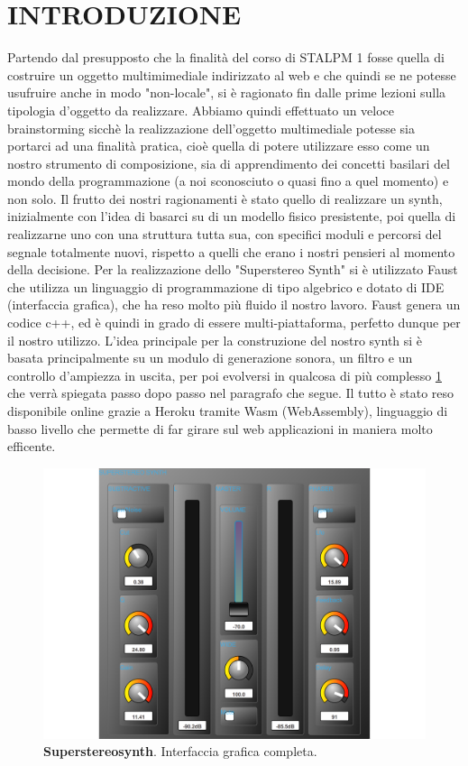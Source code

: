 \documentclass[
	a4paper,
	twocolumn
	]{article}
\begin{document}
\maketitle
\thispagestyle{empty}
\section*{INTRODUZIONE}
Partendo dal presupposto che la finalità del corso di STALPM 1 fosse quella
di costruire un oggetto multimimediale indirizzato al web e che quindi se ne
potesse usufruire anche in modo "non-locale", si è ragionato fin dalle prime
lezioni sulla tipologia d'oggetto da realizzare. Abbiamo quindi effettuato
un veloce brainstorming sicchè la realizzazione dell'oggetto multimediale
potesse sia portarci ad una finalità pratica, cioè quella di potere utilizzare
esso come un nostro strumento di composizione, sia di apprendimento dei concetti
basilari del mondo della programmazione (a noi sconosciuto o quasi fino a quel
momento) e non solo. Il frutto dei nostri ragionamenti è stato quello di realizzare un synth,
inizialmente con l'idea di basarci su di un modello fisico presistente, poi quella di
realizzarne uno con una struttura tutta sua, con specifici moduli e percorsi del segnale
totalmente nuovi, rispetto a quelli che erano i nostri pensieri al momento della decisione.
Per la realizzazione dello "Superstereo Synth" si è utilizzato Faust \cite{faust}
che utilizza un linguaggio di programmazione di tipo algebrico e dotato di IDE (interfaccia grafica), che
ha reso molto più fluido il nostro lavoro. Faust genera un codice c++, ed è quindi in grado
di essere multi-piattaforma, perfetto dunque per il nostro utilizzo. L'idea principale per
la construzione del nostro synth si è basata principalmente su un modulo di generazione sonora, un filtro e
un controllo d'ampiezza in uscita, per poi evolversi in qualcosa di più complesso \ref{superstereosynth} che verrà spiegata passo dopo passo nel paragrafo che segue. Il tutto è stato reso disponibile online \cite{heroku} grazie
a Heroku tramite Wasm (WebAssembly), linguaggio di basso livello che permette di far girare sul web applicazioni in maniera molto efficente.

\begin{figure}[h]
\begin{center}
\includegraphics[width=.47\textwidth]{img/Superstereosynth}
\caption{\textbf{Superstereosynth}. Interfaccia grafica completa.}
\label{superstereosynth}
\end{center}
\end{figure}
\end{document}
